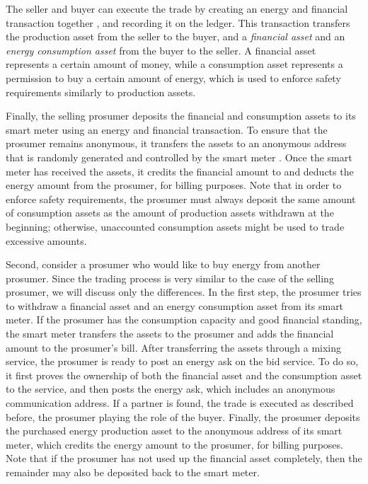 The seller and buyer can execute the trade by creating an energy and financial transaction together , and recording it on the ledger.
This transaction transfers the production asset from the seller to the buyer, and a \emph{financial asset} and an \emph{energy consumption asset} from the buyer to the seller.
A financial asset represents a certain amount of money, while a consumption asset represents a permission to buy a certain amount of energy, which is used to enforce safety requirements similarly to production assets.

Finally, the selling prosumer deposits the financial and consumption assets to its smart meter using an energy and financial transaction.
To ensure that the prosumer remains anonymous, it transfers the assets to an anonymous address that is randomly generated and controlled by the smart meter .
Once the smart meter has received the assets, it credits the financial amount to and deducts the energy amount from the prosumer, for billing purposes.
Note that in order to enforce safety requirements, the prosumer must always deposit the same amount of consumption assets as the amount of production assets withdrawn at the beginning; otherwise, unaccounted consumption assets might be used to trade excessive amounts.

Second, consider a prosumer who would like to buy energy from another prosumer.
Since the trading process is very similar to the case of the selling prosumer, we will discuss only the differences.
In the first step, the prosumer tries to withdraw a financial asset and an energy consumption asset from its smart meter.
If the prosumer has the consumption capacity and good financial standing, the smart meter transfers the assets to the prosumer and adds the financial amount to the prosumer's bill.
After transferring the assets through a mixing service, the prosumer is ready to post an energy ask on the bid service.
To do so, it first proves the ownership of both the financial asset and the consumption asset to the service, and then posts the energy ask, which includes an anonymous communication address.
If a partner is found, the trade is executed as described before, the prosumer playing the role of the buyer.
Finally, the prosumer deposits the purchased energy production asset to the anonymous address of its smart meter,
which credits the energy amount to the prosumer, for billing purposes.
Note that if the prosumer has not used up the financial asset completely, then the remainder may also be deposited back to the smart meter.





